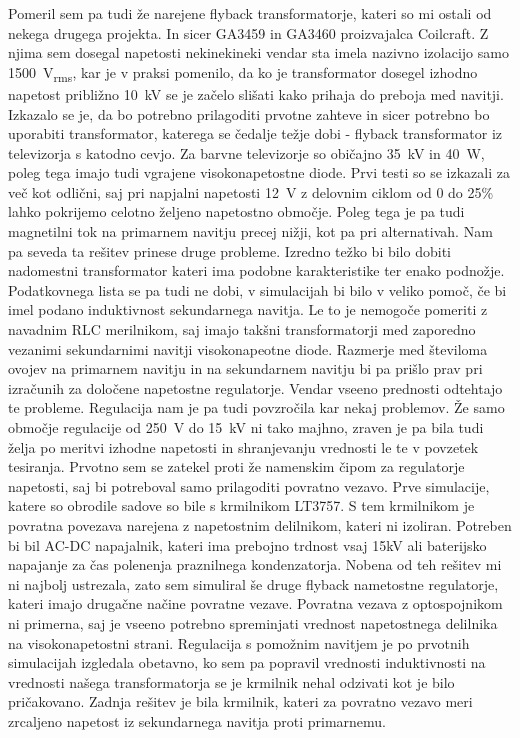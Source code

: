 \documentclass[a4paper,twoside,openright,12pt,slovene]{book}
\begin{document}
    
    Pomeril sem pa tudi že narejene flyback transformatorje, kateri so mi ostali od nekega drugega projekta. In sicer GA3459 in GA3460 proizvajalca Coilcraft. Z njima sem dosegal napetosti nekinekineki vendar sta imela nazivno izolacijo samo \SI{1500}{\volt_{rms}}, kar je v praksi pomenilo, da ko je transformator dosegel izhodno napetost približno \SI{10}{\kilo\volt} se je začelo slišati kako prihaja do preboja med navitji.
    Izkazalo se je, da bo potrebno prilagoditi prvotne zahteve in sicer potrebno bo uporabiti transformator, katerega se čedalje težje dobi - flyback transformator iz televizorja s katodno cevjo. Za barvne televizorje so običajno \SI{35}{\kilo\volt} in \SI{40}{\watt}, poleg tega imajo tudi vgrajene visokonapetostne diode. Prvi testi so se izkazali za več kot odlični, saj pri napjalni napetosti \SI{12}{\volt} z delovnim ciklom od 0 do 25\% lahko pokrijemo celotno željeno napetostno območje. Poleg tega je pa tudi magnetilni tok na primarnem navitju precej nižji, kot pa pri alternativah. 
    Nam pa seveda ta rešitev prinese druge probleme. Izredno težko bi bilo dobiti nadomestni transformator kateri ima podobne karakteristike ter enako podnožje. Podatkovnega lista se pa tudi ne dobi, v simulacijah bi bilo v veliko pomoč, če bi imel podano induktivnost sekundarnega navitja. Le to je nemogoče pomeriti z navadnim RLC merilnikom, saj imajo takšni transformatorji med zaporedno vezanimi sekundarnimi navitji visokonapeotne diode. Razmerje med številoma ovojev na primarnem navitju in na sekundarnem navitju bi pa prišlo prav pri izračunih za določene napetostne regulatorje.
    Vendar vseeno prednosti odtehtajo te probleme. 
    Regulacija nam je pa tudi povzročila kar nekaj problemov. Že samo območje regulacije od \SI{250}{\volt} do \SI{15}{\kilo\volt} ni tako majhno, zraven je pa bila tudi želja po meritvi izhodne napetosti in shranjevanju vrednosti le te v povzetek tesiranja. Prvotno sem se zatekel proti že namenskim čipom za regulatorje napetosti, saj bi potreboval samo prilagoditi povratno vezavo. Prve simulacije, katere so obrodile sadove so bile s krmilnikom LT3757. S tem krmilnikom je povratna povezava narejena z napetostnim delilnikom, kateri ni izoliran. Potreben bi bil AC-DC napajalnik, kateri ima prebojno trdnost vsaj 15kV ali baterijsko napajanje za čas polenenja praznilnega kondenzatorja.
    Nobena od teh rešitev mi ni najbolj ustrezala, zato sem simuliral še druge flyback nametostne regulatorje, kateri imajo drugačne načine povratne vezave. Povratna vezava z optospojnikom ni primerna, saj je vseeno potrebno spreminjati vrednost napetostnega delilnika na visokonapetostni strani. Regulacija s pomožnim navitjem je po prvotnih simulacijah izgledala obetavno, ko sem pa popravil vrednosti induktivnosti na vrednosti našega transformatorja se je krmilnik nehal odzivati kot je bilo pričakovano. Zadnja rešitev je bila krmilnik, kateri za povratno vezavo meri zrcaljeno napetost iz sekundarnega navitja proti primarnemu. 
\end{document}
